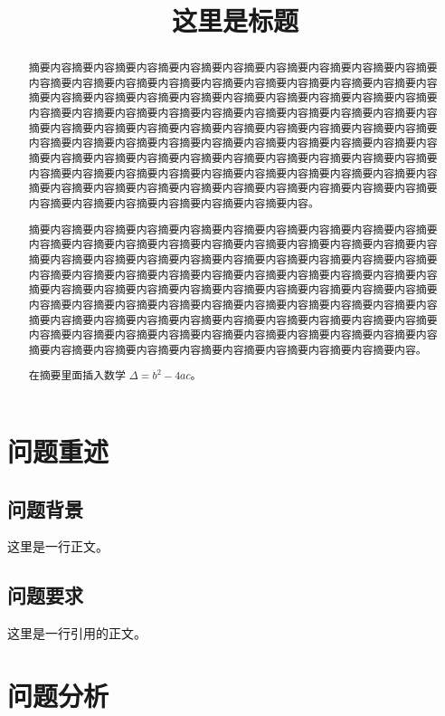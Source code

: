 \documentclass{cumcmthesis}
\title{这里是标题}
\begin{document}
\maketitle
\begin{abstract}
    摘要内容摘要内容摘要内容摘要内容摘要内容摘要内容摘要内容摘要内容摘要内容摘要内容摘要内容摘要内容摘要内容摘要内容摘要内容摘要内容摘要内容摘要内容摘要内容摘要内容摘要内容摘要内容摘要内容摘要内容摘要内容摘要内容摘要内容摘要内容摘要内容摘要内容摘要内容摘要内容摘要内容摘要内容摘要内容摘要内容摘要内容摘要内容摘要内容摘要内容摘要内容摘要内容摘要内容摘要内容摘要内容摘要内容摘要内容摘要内容摘要内容摘要内容摘要内容摘要内容摘要内容摘要内容摘要内容摘要内容摘要内容摘要内容摘要内容摘要内容摘要内容摘要内容摘要内容摘要内容摘要内容摘要内容摘要内容摘要内容摘要内容摘要内容摘要内容摘要内容摘要内容摘要内容摘要内容摘要内容摘要内容摘要内容摘要内容摘要内容摘要内容摘要内容摘要内容摘要内容摘要内容摘要内容摘要内容摘要内容摘要内容摘要内容摘要内容摘要内容。
    \par 摘要内容摘要内容摘要内容摘要内容摘要内容摘要内容摘要内容摘要内容摘要内容摘要内容摘要内容摘要内容摘要内容摘要内容摘要内容摘要内容摘要内容摘要内容摘要内容摘要内容摘要内容摘要内容摘要内容摘要内容摘要内容摘要内容摘要内容摘要内容摘要内容摘要内容摘要内容摘要内容摘要内容摘要内容摘要内容摘要内容摘要内容摘要内容摘要内容摘要内容摘要内容摘要内容摘要内容摘要内容摘要内容摘要内容摘要内容摘要内容摘要内容摘要内容摘要内容摘要内容摘要内容摘要内容摘要内容摘要内容摘要内容摘要内容摘要内容摘要内容摘要内容摘要内容摘要内容摘要内容摘要内容摘要内容摘要内容摘要内容摘要内容摘要内容摘要内容摘要内容摘要内容摘要内容摘要内容摘要内容摘要内容摘要内容摘要内容摘要内容摘要内容摘要内容摘要内容摘要内容摘要内容。
    \par 在摘要里面插入数学 $\Delta = b^2 - 4ac$。
\end{abstract}
\section{问题重述}
\subsection{问题背景}
这里是一行正文。
\subsection{问题要求}
这里是一行引用的正文。
\section{问题分析}
\end{document}
